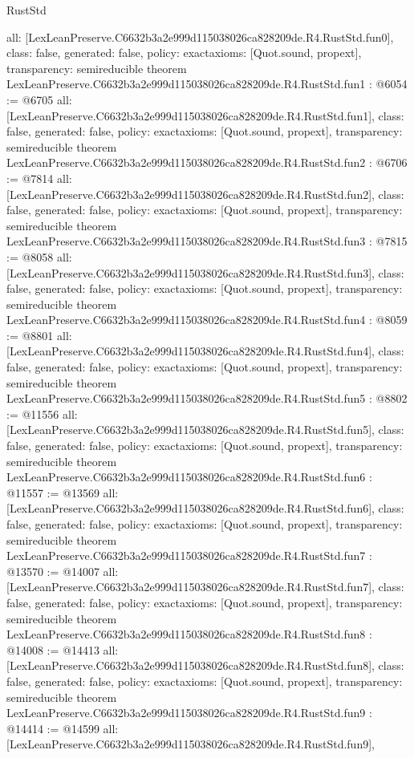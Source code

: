 \begin{lexlean}{RustStd}
\begin{coremodule}
{  all: [LexLeanPreserve.C6632b3a2e999d115038026ca828209de.R4.RustStd.fun0],
  class: false,
  generated: false,
  policy: exact{axioms: [Quot.sound, propext]},
  transparency: semireducible
}
theorem LexLeanPreserve.C6632b3a2e999d115038026ca828209de.R4.RustStd.fun1 : @6054 := @6705 {
  all: [LexLeanPreserve.C6632b3a2e999d115038026ca828209de.R4.RustStd.fun1],
  class: false,
  generated: false,
  policy: exact{axioms: [Quot.sound, propext]},
  transparency: semireducible
}
theorem LexLeanPreserve.C6632b3a2e999d115038026ca828209de.R4.RustStd.fun2 : @6706 := @7814 {
  all: [LexLeanPreserve.C6632b3a2e999d115038026ca828209de.R4.RustStd.fun2],
  class: false,
  generated: false,
  policy: exact{axioms: [Quot.sound, propext]},
  transparency: semireducible
}
theorem LexLeanPreserve.C6632b3a2e999d115038026ca828209de.R4.RustStd.fun3 : @7815 := @8058 {
  all: [LexLeanPreserve.C6632b3a2e999d115038026ca828209de.R4.RustStd.fun3],
  class: false,
  generated: false,
  policy: exact{axioms: [Quot.sound, propext]},
  transparency: semireducible
}
theorem LexLeanPreserve.C6632b3a2e999d115038026ca828209de.R4.RustStd.fun4 : @8059 := @8801 {
  all: [LexLeanPreserve.C6632b3a2e999d115038026ca828209de.R4.RustStd.fun4],
  class: false,
  generated: false,
  policy: exact{axioms: [Quot.sound, propext]},
  transparency: semireducible
}
theorem LexLeanPreserve.C6632b3a2e999d115038026ca828209de.R4.RustStd.fun5 : @8802 := @11556 {
  all: [LexLeanPreserve.C6632b3a2e999d115038026ca828209de.R4.RustStd.fun5],
  class: false,
  generated: false,
  policy: exact{axioms: [Quot.sound, propext]},
  transparency: semireducible
}
theorem LexLeanPreserve.C6632b3a2e999d115038026ca828209de.R4.RustStd.fun6 : @11557 := @13569 {
  all: [LexLeanPreserve.C6632b3a2e999d115038026ca828209de.R4.RustStd.fun6],
  class: false,
  generated: false,
  policy: exact{axioms: [Quot.sound, propext]},
  transparency: semireducible
}
theorem LexLeanPreserve.C6632b3a2e999d115038026ca828209de.R4.RustStd.fun7 : @13570 := @14007 {
  all: [LexLeanPreserve.C6632b3a2e999d115038026ca828209de.R4.RustStd.fun7],
  class: false,
  generated: false,
  policy: exact{axioms: [Quot.sound, propext]},
  transparency: semireducible
}
theorem LexLeanPreserve.C6632b3a2e999d115038026ca828209de.R4.RustStd.fun8 : @14008 := @14413 {
  all: [LexLeanPreserve.C6632b3a2e999d115038026ca828209de.R4.RustStd.fun8],
  class: false,
  generated: false,
  policy: exact{axioms: [Quot.sound, propext]},
  transparency: semireducible
}
theorem LexLeanPreserve.C6632b3a2e999d115038026ca828209de.R4.RustStd.fun9 : @14414 := @14599 {
  all: [LexLeanPreserve.C6632b3a2e999d115038026ca828209de.R4.RustStd.fun9],
}
\end{coremodule}
\end{lexlean}
